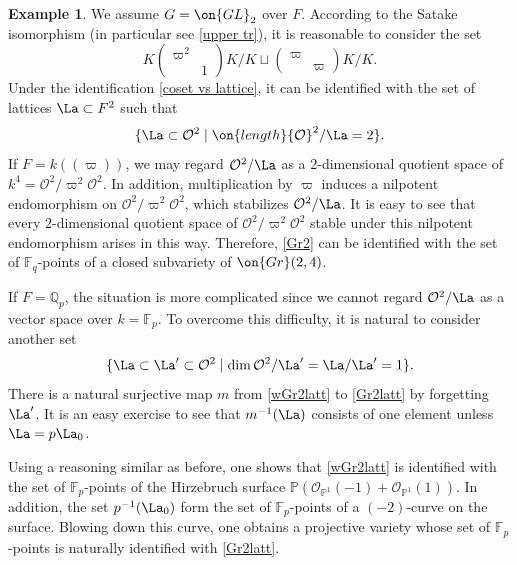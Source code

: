 \documentclass[11pt]{amsart}
\theoremstyle{definition}
\theoremstyle{definition}
\newtheorem{ex}[thm]{Example}
\theoremstyle{definition}
\numberwithin{equation}{subsection}
\newcommand{\bF}{{\mathbb F}}
\newcommand{\bP}{{\mathbb P}}
\newcommand{\bQ}{{\mathbb Q}}
\newcommand{\mO}{{\mathcal O}}
\newcommand{\Gr}{{\on{Gr}}}
\newcommand{\GL}{{\on{GL}}}
\begin{document}
\begin{ex}\label{quasiminuSch}
We assume $G=\GL_2$ over $F$. According to the Satake isomorphism (in particular see \eqref{upper tr}), it is reasonable to consider the set 
\begin{equation}\label{Gr2}
K\begin{pmatrix}\varpi^2 & \\ &1 \end{pmatrix}K/K\sqcup \begin{pmatrix}\varpi & \\ &\varpi \end{pmatrix} K/K.
\end{equation} Under the identification \eqref{coset vs lattice}, it can be identified with the set of lattices $\La\subset F^2$ such that 
\begin{equation}\label{Gr2latt}
\{\La\subset \mO^2\mid \on{length}\mO^2/\La=2\}.
\end{equation}
If $F=k((\varpi))$, we may regard $\mO^2/\La$ as a $2$-dimensional quotient space of $k^4=\mO^2/\varpi^2\mO^2$. In addition, multiplication by $\varpi$ induces a nilpotent endomorphism on $\mO^2/\varpi^2\mO^2$, which stabilizes $\mO^2/\La$. It is easy to see that every $2$-dimensional quotient space of $\mO^2/\varpi^2\mO^2$ stable under this nilpotent endomorphism arises in this way. Therefore, \eqref{Gr2} can be identified with the set of $\bF_q$-points of a closed subvariety of $\Gr(2,4)$.

If $F=\bQ_p$, the situation is more complicated since we cannot regard $\mO^2/\La$ as a vector space over $k=\bF_p$. To overcome this difficulty, it is natural to consider another set
\begin{equation}\label{wGr2latt}
\{\La\subset\La'\subset \mO^2\mid \dim\mO^2/\La'=\La/\La'=1\}.
\end{equation}
There is a natural surjective map $m$ from \eqref{wGr2latt} to \eqref{Gr2latt} by forgetting $\La'$. It is an easy exercise to see that $m^{-1}(\La)$ consists of one element unless $\La=p\La_0$.
 
Using a reasoning similar as before, one shows that \eqref{wGr2latt} is identified with the set of $\bF_p$-points of the Hirzebruch surface $\bP(\mO_{\bP^1}(-1)+\mO_{\bP^1}(1))$. In addition, the set $p^{-1}(\La_0)$ form the set of $\bF_p$-points of a $(-2)$-curve on the surface. Blowing down this curve, one obtains a projective variety whose set of $\bF_p$-points is naturally identified with \eqref{Gr2latt}.
\end{ex}
\end{document}

